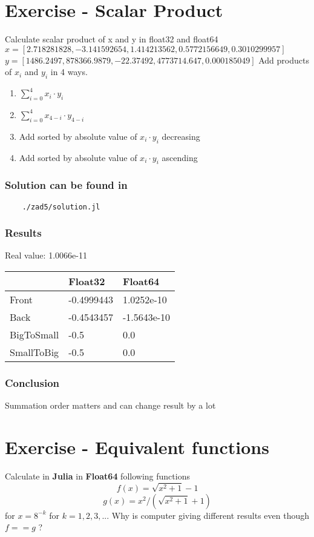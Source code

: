 \documentclass[12pt]{article}
\begin{document}
\section{Exercise - Scalar Product}
Calculate scalar product of x and y in float32 and float64\newline
$x = [2.718281828, -3.141592654, 1.414213562, 0.5772156649, 0.3010299957]$ \newline
$y = [1486.2497, 878366.9879, -22.37492, 4773714.647, 0.000185049]$ \newline
Add products of $x_i$ and $y_i$ in 4 ways.
\begin{enumerate}
    \item $\sum_{i=0}^{4}x_i \cdot y_i$
    \item $\sum_{i=0}^{4}x_{4-i} \cdot y_{4-i}$
    \item Add sorted by absolute value of $x_i \cdot y_i$ decreasing
    \item Add sorted by absolute value of $x_i \cdot y_i$ ascending
\end{enumerate}
\subsubsection*{Solution can be found in}
\begin{verbatim}
    ./zad5/solution.jl
\end{verbatim}
\subsubsection*{Results}
Real value:  1.0066e-11
\begin{table}[!ht]
    \centering
    \begin{tabular}{|l|l|l|}
    \hline
        ~ & Float32 & Float64 \\ \hline
        Front & -0.4999443 & 1.0252e-10 \\ \hline
        Back & -0.4543457 & -1.5643e-10 \\ \hline
        BigToSmall & -0.5 & 0.0 \\ \hline
        SmallToBig & -0.5 & 0.0 \\ \hline
    \end{tabular}
\end{table}
\subsubsection*{Conclusion}
Summation order matters and can change result by a lot
\section{Exercise - Equivalent functions}
Calculate in \textbf{Julia} in \textbf{Float64} following functions 
$$f(x) = \sqrt{x^2 + 1} - 1$$
$$g(x) = x^2 / (\sqrt{x^2 + 1} + 1)$$
for $x = 8^{-k}$ for $k=1,2,3,...$ \newline
Why is computer giving different results even though $f==g$ ?
\end{document}

